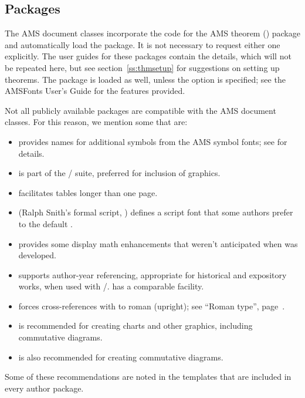 \subsection{Packages}
The AMS document classes incorporate the code for the AMS theorem
() package and automatically load the 
package.  It is not necessary to request either one explicitly.
The user guides for these packages \cite{ATH,AMG} contain the details,
which will not be repeated here, but see section~\ref{ss:thmsetup}
for suggestions on setting up theorems.  The  package
is loaded as well, unless the  option is specified;
see the AMSFonts User's Guide \cite{AFG} for the features provided.

Not all publicly available packages are compatible with the AMS
document classes.  For this reason, we mention some that are:
\begin{itemize}
\item {} provides names for additional symbols from the
 AMS symbol fonts; see \cite{AFG} for details.
\item {} is part of the \latex/ suite, preferred for
 inclusion of graphics.
\item {} facilitates tables longer than one page.
\item {} (Ralph Snith's formal script, ) defines
 a script font that some authors prefer to the default .
\item {} provides some display math enhancements that
 weren't anticipated when  was developed.
\item {} supports author-year referencing, appropriate for
 historical and expository works, when used with \bibtex/.
  has a comparable facility.
\item {} forces cross-references with  to roman (upright);
 see ``Roman type'', page~\pageref{ss:roman}.
\item {} is recommended for creating charts and other graphics,
 including commutative diagrams.
\item {} is also recommended for creating commutative diagrams.
\end{itemize}
Some of these recommendations are noted in the templates that are
included in every author package.

